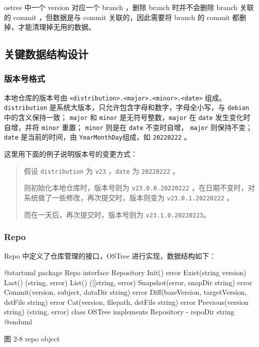 \documentclass{utart}
\begin{document}
ostree 中一个 version 对应一个 branch ，删除 branch 时并不会删除 branch 关联的 commit ，但数据是与 commit 关联的，因此需要将 branch 的 commit 都删掉，才能清理掉无用的数据。

\subsection{关键数据结构设计}
\subsubsection{版本号格式}
本地仓库的版本号由 \texttt{<distribution>.<major>.<minor>.<date>} 组成。
\texttt{distribution} 是系统大版本，只允许包含字母和数字，字母全小写，与 \texttt{debian} 中的含义保持一致；
\texttt{major} 和 \texttt{minor} 是无符号整数，\texttt{major} 在 \texttt{date} 发生变化时自增，并将 \texttt{minor} 重置；
\texttt{minor} 则是在 \texttt{date} 不变时自增， \texttt{major} 则保持不变；
\texttt{date} 是当前的时间，由 \texttt{YearMonthDay}组成，如 \texttt{20220222} 。

这里用下面的例子说明版本号的变更方式：

\begin{quote}
假设 \texttt{distribution} 为 \texttt{v23} ，\texttt{date} 为 \texttt{20220222} 。

则初始化本地仓库时，版本号则为 \texttt{v23.0.0.20220222} ，在日期不变时，对系统做了一些修改，再次提交时，版本则变为 \texttt{v23.0.1.20220222} 。

而在一天后，再次提交时，版本号则为 \texttt{v23.1.0.20220223}。
\end{quote}

\subsubsection{Repo}
Repo 中定义了仓库管理的接口，OSTree 进行实现，数据结构如下：
\begin{center}
  \begin{adjustbox}{scale=0.75}
    \begin{plantuml}
      @startuml
      package Repo {
        interface Repository {
          Init() error
          Exist(string version)
          Last() (string, error)
          List() ([]string, error)
          Snapshot(error, snapDir string) error
          Commit(version, subject, dataDir string) error
          Diff(baseVersion, targetVersion, dstFile string) error
          Cat(version, filepath, dstFile string) error
          Previous(version string) (string, error)
        }
        class OSTree implements Repository {
          - repoDir string
        }
      }
      @enduml
    \end{plantuml}
  \end{adjustbox}

  图 2-8 repo object
\end{center}
\end{document}
